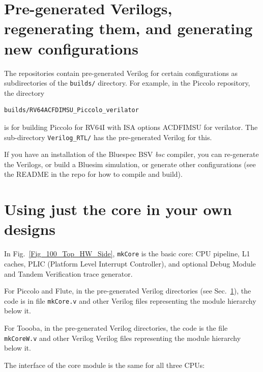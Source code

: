 \documentclass[11pt]{book}
\newcommand{\cf}{\footnotesize\tt}
\begin{document}

\section{Pre-generated Verilogs, regenerating them, and generating new configurations}

\label{sec_pre_gen_Verilog}

The repositories contain pre-generated Verilog for certain
configurations as subdirectories of the {\cf builds/} directory.  For
example, in the Piccolo repository, the directory
\begin{Verbatim}[frame=single]
    builds/RV64ACFDIMSU_Piccolo_verilator
\end{Verbatim}
is for building Piccolo for RV64I with ISA options ACDFIMSU for
verilator.  The sub-directory {\cf Verilog\_RTL/} has the
pre-generated Verilog for this.

If you have an installation of the Bluespec BSV \emph{bsc} compiler,
you can re-generate the Verilogs, or build a Bluesim simulation, or
generate other configurations (see the README in the repo for how to
compile and build).


\section{Using just the core in your own designs}

\label{sec_mkCore}

In Fig.~\ref{Fig_100_Top_HW_Side}, {\cf mkCore} is the basic core: CPU
pipeline, L1 caches, PLIC (Platform Level Interrupt Controller), and
optional Debug Module and Tandem Verification trace generator.

For Piccolo and Flute, in the pre-generated Verilog directories (see
Sec.~\ref{sec_pre_gen_Verilog}), the code is in file {\cf mkCore.v} and
other Verilog files representing the module hierarchy below it.

For Toooba, in the pre-generated Verilog directories, the code is the
file {\cf mkCoreW.v} and other Verilog Verilog files representing the
module hierarchy below it.

The interface of the core module is the same for all three CPUs:
\end{document}
